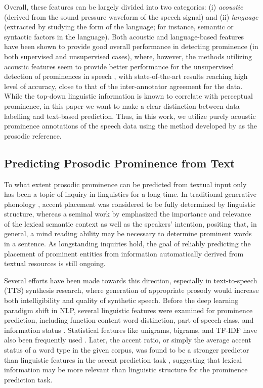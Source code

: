 \documentclass[11pt]{article}
\begin{document}
Overall, these features can be largely divided into two categories: (i) \textit{acoustic} (derived from the sound pressure waveform of the speech signal) and (ii) \textit{language} (extracted by studying the form of the language; for instance, semantic or syntactic factors in the language). Both acoustic and language-based features have been shown to provide good overall performance in detecting prominence (in both supervised and unsupervised cases), where, however, the methods utilizing acoustic features seem to provide better performance for the unsupervised detection of prominences in speech \cite{suni2017hierarchical,wang2007acoustic,kakouros20163pro}, with state-of-the-art results reaching high level of accuracy, close to that of the inter-annotator agreement for the data. While the top-down linguistic information is known to correlate with perceptual prominence, in this paper we want to make a clear distinction between data labelling and text-based prediction. Thus, in this work, we utilize purely acoustic prominence annotations of the speech data using the method developed by \citet{suni2017hierarchical} as the prosodic reference.

\subsection{Predicting Prosodic Prominence from Text}
To what extent prosodic prominence can be predicted from textual input only has been a topic of inquiry in linguistics for a long time. In traditional generative phonology \cite{chomsky1968sound}, accent placement was considered to be fully determined by linguistic structure, whereas a seminal work by \citet{bolinger1972accent} emphasized the importance and relevance of the lexical semantic context as well as the speakers' intention, positing that, in general, a mind reading ability may be necessary to determine prominent words in a sentence. As longstanding inquiries hold, the goal of reliably predicting the placement of prominent entities from information automatically derived from textual resources is still ongoing. 

Several efforts have been made towards this direction, especially in text-to-speech (TTS) synthesis research, where generation of appropriate prosody would increase both intelligibility and quality of synthetic speech.
Before the deep learning paradigm shift in NLP, several linguistic features were examined for prominence prediction, including function-content word distinction, part-of-speech class, and information status \cite{hirschberg1993pitch}. Statistical features like unigrams, bigrams, and TF-IDF have also been frequently used \cite{Marsi}.  Later, the accent ratio, or simply the average accent status of a word type in the given corpus, was found to be a stronger predictor than linguistic features in the accent prediction task \cite{nenkova2007memorize}, suggesting that lexical information may be more relevant than linguistic structure for the prominence prediction task.
\end{document}
